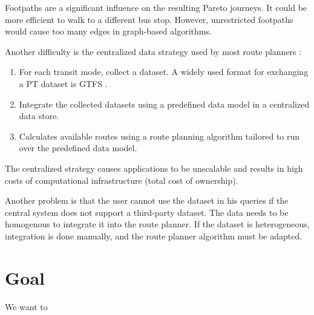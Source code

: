 Footpaths are a significant influence on the resulting Pareto journeys. It could be more efficient to walk to a different bus stop. However, unrestricted footpaths would cause too many edges in graph-based algorithms.

Another difficulty is the centralized data strategy used by most route planners \cite{rojas_melendez_julian_andres_decentralized_2020}:
\begin{enumerate}
    \item For each transit mode, collect a dataset. A widely used format for exchanging a PT dataset is GTFS \cite{noauthor_gtfs_2022}.
    \item Integrate the collected datasets using a predefined data model in a centralized data store.
    \item Calculates available routes using a route planning algorithm tailored to run over the predefined data model.
\end{enumerate}
The centralized strategy causes applications to be unscalable and results in high costs of computational infrastructure (total cost of ownership). 

Another problem is that the user cannot use the dataset in his queries if the central system does not support a third-party dataset. The data needs to be homogenous to integrate it into the route planner. If the dataset is heterogeneous, integration is done manually, and the route planner algorithm must be adapted.

\section{Goal}

We want to 


